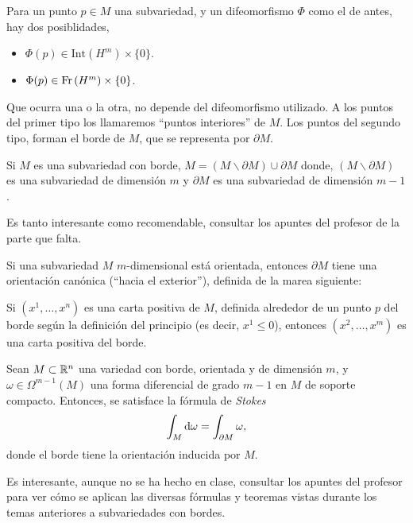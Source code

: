 \begin{defi}
    Para un punto $p \in M$ una subvariedad, y un difeomorfismo $\Phi$ como el de antes, hay dos posiblidades,
    \begin{itemize}
        \item $\Phi(p) \in \text{Int}\left( H^m \right) \times \{0\}$.
        \item $\Phi(p) \in \operatorname{Fr} \left( H^m \right) \times \{0\}$.
    \end{itemize}
    Que ocurra una o la otra, no depende del difeomorfismo utilizado. A los puntos del primer tipo los llamaremos
    ``puntos interiores'' de $M$. Los puntos del segundo tipo, forman el borde de $M$, que se representa por $\partial M$.
\end{defi}

\begin{prop}
    Si $M$ es una subvariedad con borde, $M = \left( M \smallsetminus \partial M \right) \cup \partial M$ donde,
    $\left( M \smallsetminus \partial M \right)$ es una subvariedad de dimensión $m$ y $\partial M$ es una subvariedad
    de dimensión $m-1$.
\end{prop}

Es tanto interesante como recomendable, consultar los apuntes del profesor de la parte que falta.

\setcounter{lema}{7}

\begin{prop}
    Si una subvariedad $M$ $m$-dimensional está orientada, entonces $\partial M$ tiene una orientación canónica (``hacia el
    exterior''), definida de la marea siguiente:

    Si $\left( x^1, \dots, x^n \right)$ es una carta positiva de $M$, definida alrededor de un punto $p$ del borde según la definición
    del principio (es decir, $x^1 \leq 0$), entonces $\left( x^2, \dots, x^m \right)$ es una carta positiva del borde.
\end{prop}

\begin{teo}[de Stokes]
    Sean $M \subset \mathbb{R}^n$ una variedad con borde, orientada y de dimensión $m$, y $\omega \in \Omega^{m-1}(M)$ una forma
    diferencial de grado $m-1$ en $M$ de soporte compacto. Entonces, se satisface la fórmula de \emph{Stokes}
    \[
        \int_M \dif \omega = \int_{\partial M} \omega,
    \]
    donde el borde tiene la orientación inducida por $M$.
\end{teo}

Es interesante, aunque no se ha hecho en clase, consultar los apuntes del profesor para ver cómo se aplican las diversas fórmulas
y teoremas vistas durante los temas anteriores a subvariedades con bordes.
